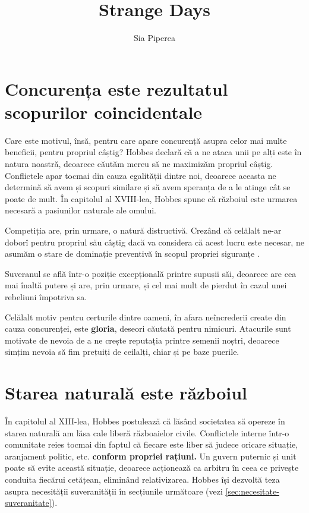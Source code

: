 \documentclass[12pt]{article}
\title{Strange Days}
\author{Sia Piperea}
\begin{document}
	 	
	\maketitle
	 	
	 

	 	
	 	\section{Concurența este rezultatul scopurilor coincidentale}
	 	Care este motivul, însă, pentru care apare concurență asupra celor mai multe beneficii, pentru propriul câștig? Hobbes declară că a ne ataca unii pe alți este în natura noastră, deoarece căutăm mereu să ne maximizăm propriul câștig. Conflictele apar tocmai din cauza egalității dintre noi, deoarece aceasta ne determină să avem și scopuri similare și să avem speranța de a le atinge cât se poate de mult. În capitolul al XVIII-lea, Hobbes spune că războiul este \dedouble urmarea necesară a pasiunilor naturale ale omului\sqtworight.\par 
	 	
	 	Competiția are, prin urmare, o natură distructivă. Crezând că celălalt ne-ar doborî pentru propriul său câștig dacă va considera că acest lucru este necesar, ne asumăm o stare de dominație preventivă în scopul propriei siguranțe \parencite{ailonPhenomenologyHomoEconomicus2020}.\par
	 	
	 	Suveranul se află într-o poziție excepțională printre supușii săi, deoarece are cea mai înaltă putere și are, prin urmare, și cel mai mult de pierdut în cazul unei rebeliuni împotriva sa.\par
	 	
	 	Celălalt motiv pentru certurile dintre oameni, în afara neîncrederii create din cauza concurenței, este \textbf{gloria}, deseori căutată pentru nimicuri. Atacurile sunt motivate de nevoia de a ne crește reputația printre semenii noștri, deoarece simțim nevoia să fim prețuiți de ceilalți, chiar și pe baze puerile.\par
	 	
	 	\section{Starea naturală este războiul}
	 	
	 	În capitolul al XIII-lea, Hobbes postulează că lăsând societatea să opereze în starea naturală am lăsa cale liberă războaielor civile. Conflictele interne într-o comunitate reies tocmai din faptul că fiecare este liber să judece oricare situație, aranjament politic, etc. \textbf{conform propriei rațiuni.} Un guvern puternic și unit poate să evite această situație, deoarece acționează ca arbitru în ceea ce privește conduita fiecărui cetățean, eliminând relativizarea. Hobbes își dezvoltă teza asupra necesității suveranității în secțiunile următoare (vezi \ref{sec:necesitate-suveranitate}). \par
	 	
\end{document}
